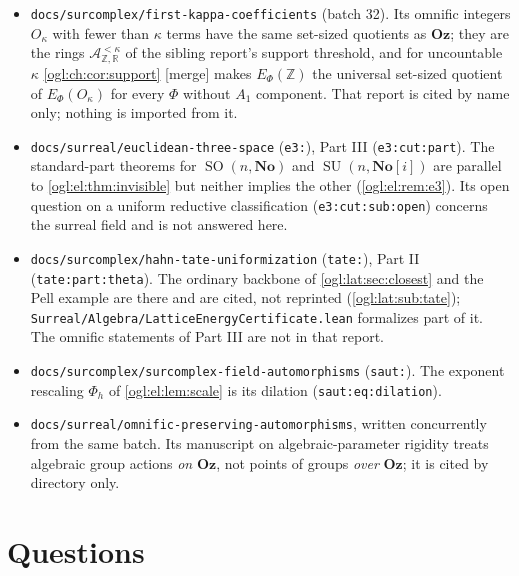 \documentclass[11pt,oneside]{article}
\numberwithin{equation}{section}
\theoremstyle{definition}
\theoremstyle{remark}
\newcommand{\No}{\mathbf{No}}
\newcommand{\Oz}{\mathbf{Oz}}
\newcommand{\SC}{\No[i]}
\newcommand{\Z}{\mathbb Z}
\newcommand{\R}{\mathbb R}
\newcommand{\A}{\mathcal A}
\newcommand{\SO}{\operatorname{SO}}
\newcommand{\SU}{\operatorname{SU}}
\newcommand{\mergetag}{\textup{\textsf{\small[merge]}}}
\newcommand{\replabel}[1]{\nolinkurl{#1}}
\newcommand{\fn}[1]{\nolinkurl{#1}}
\begin{document}
\begin{itemize}[leftmargin=*]
rational kernel flags of \cref{ogl:lat:part}. Neither is used here.
 (source 12) uses \replabel{osq:thm:universal}(iii) as the
ring input for every root system without $A_1$ component and for current Lie
rings, shows that ring and group invisibility are equivalent for every Dorroh
unitization (\cref{ogl:ch:thm:equivalence}), and with
\replabel{osq:prop:card11} and \replabel{osq:thm:thresholds} gives the exact
thresholds of \cref{ogl:ch:cor:thresholds}.
\item \fn{docs/surcomplex/first-kappa-coefficients} (batch 32). Its omnific
integers $O_\kappa$ with fewer than $\kappa$ terms have the same set-sized
quotients as $\Oz$; they are the rings $\A^{<\kappa}_{\Z,\R}$ of the sibling
report's support threshold, and for uncountable $\kappa$
\cref{ogl:ch:cor:support} \mergetag{} makes $E_\Phi(\Z)$ the universal
set-sized quotient of $E_\Phi(O_\kappa)$ for every $\Phi$ without $A_1$
component. That report is cited by name only; nothing is imported from it.
\item \fn{docs/surreal/euclidean-three-space} (\texttt{e3:}), Part III
(\replabel{e3:cut:part}). The standard-part theorems for $\SO(n,\No)$ and
$\SU(n,\SC)$ are parallel to \cref{ogl:el:thm:invisible} but neither implies the
other (\cref{ogl:el:rem:e3}). Its open question on a uniform reductive
classification (\replabel{e3:cut:sub:open}) concerns the surreal field and is not
answered here.
\item \fn{docs/surcomplex/hahn-tate-uniformization} (\texttt{tate:}), Part II
(\replabel{tate:part:theta}). The ordinary backbone of \cref{ogl:lat:sec:closest}
and the Pell example are there and are cited, not reprinted
(\cref{ogl:lat:sub:tate}); \fn{Surreal/Algebra/LatticeEnergyCertificate.lean}
formalizes part of it. The omnific statements of Part III are not in that
report.
\item \fn{docs/surcomplex/surcomplex-field-automorphisms} (\texttt{saut:}). The
exponent rescaling $\Phi_h$ of \cref{ogl:el:lem:scale} is its dilation
(\replabel{saut:eq:dilation}).
\item \fn{docs/surreal/omnific-preserving-automorphisms}, written concurrently
from the same batch. Its manuscript on algebraic-parameter rigidity treats
algebraic group actions \emph{on} $\Oz$, not points of groups \emph{over} $\Oz$;
it is cited by directory only.
\end{itemize}

\section{Questions}\label{ogl:sec:questions}
\end{document}
